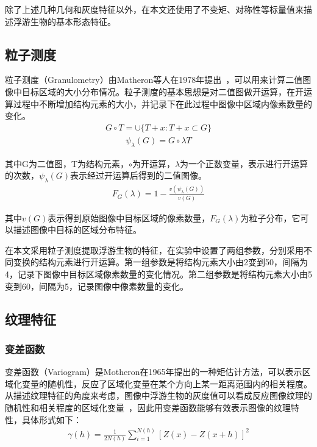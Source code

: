 除了上述几种几何和灰度特征以外，在本文还使用了不变矩、对称性等标量值来描述浮游生物的基本形态特征。

\subsection{粒子测度}

粒子测度（Granulometry）由Matheron等人在1978年提出~\cite{matheron1978randoms}，可以用来计算二值图像中目标区域的大小分布情况。粒子测度的基本思想是对二值图做开运算，在开运算过程中不断增加结构元素的大小，并记录下在此过程中图像中区域内像素数量的变化。
\begin{eqnarray}
G\circ T = \cup\{T+x : T+x \subset G \}
\end{eqnarray}
\begin{eqnarray}
\psi_{\lambda}(G) = G\circ\lambda T
\end{eqnarray}

其中G为二值图，T为结构元素，$\circ$为开运算，$\lambda$为一个正数变量，表示进行开运算的次数，$\psi_{\lambda}(G)$表示经过开运算后得到的二值图像。
\begin{eqnarray}
F_{G}(\lambda) = 1-\frac{v(\psi_{\lambda}(G))}{v(G)}
\end{eqnarray}

其中$v(G)$表示得到原始图像中目标区域的像素数量，$F_{G}(\lambda)$为粒子分布，它可以描述图像中目标的区域分布特征。

在本文采用粒子测度提取浮游生物的特征，在实验中设置了两组参数，分别采用不同变换的结构元素进行开运算。第一组参数是将结构元素大小由2变到50，间隔为4，记录下图像中目标区域像素数量的变化情况。第二组参数是将结构元素大小由5变到60，间隔为5，记录图像中像素数量的变化。

\subsection{纹理特征}

\subsubsection{变差函数}

变差函数（Variogram）是Motheron在1965年提出的一种矩估计方法，可以表示区域化变量的随机性，反应了区域化变量在某个方向上某一距离范围内的相关程度。从描述纹理特征的角度来考虑，图像中浮游生物的灰度值可以看成反应图像纹理的随机性和相关程度的区域化变量~\cite{曹健渭2010基于散斑纹理变差函数的平磨表面粗糙度测量技术}，因此用变差函数能够有效表示图像的纹理特性，具体形式如下：
\begin{eqnarray}
\gamma(h) = \frac{1}{2N(h)}\sum^{N(h)}_{i=1}[Z(x)-Z(x+h)]^{2}
\end{eqnarray}

